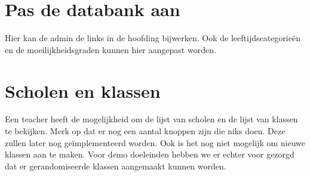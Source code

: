 \documentclass[]{article}
\begin{document}
\section{Pas de databank aan}
Hier kan de admin de links in de hoofding bijwerken. Ook de leeftijdscategorieën en de moeilijkheidsgraden kunnen hier aangepast worden.

\section{Scholen en klassen}
Een teacher heeft de mogelijkheid om de lijst van scholen en de lijst van klassen te bekijken. Merk op dat er nog een aantal knoppen zijn die niks doen. Deze 
zullen later nog ge\"implementeerd worden. Ook is het nog niet mogelijk om nieuwe klassen aan te maken. Voor demo
doeleinden hebben we er echter voor gezorgd dat er gerandomiseerde klassen aangemaakt kunnen worden. 
\end{document}
